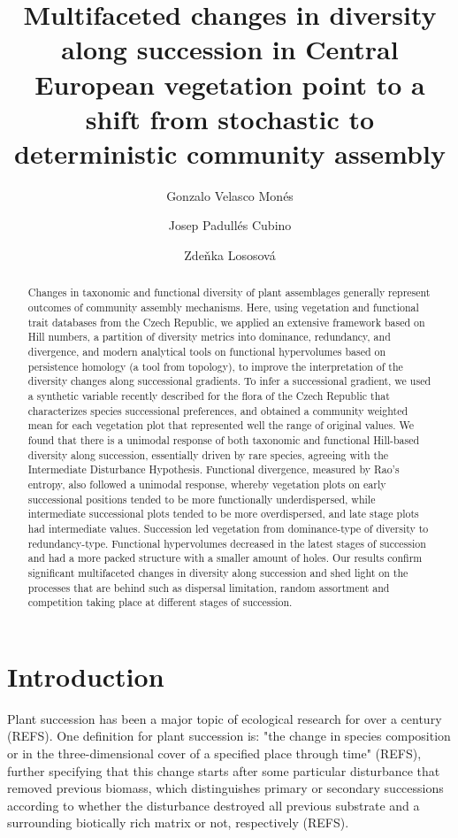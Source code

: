 \documentclass[a4paper, 9pt]{article}
\title{Multifaceted changes in diversity along succession in Central European vegetation point to a shift from stochastic to deterministic community assembly}
\author[1]{Gonzalo Velasco Monés}
\author[2,3]{Josep Padullés Cubino}
\author[1]{Zdeňka Lososová}
\affil[1]{
	Department of Botany \& Zoology, Faculy of Science, Masaryk University, Kotlářská 2, 611 37, Brno, Czech Republic}
\affil[2]{
	Autonomous University of Barcelona, 08193 Cerdanyola del Vallès, Spain}
\affil[3]{
	Centre de Recerca d’Ecologia i Aplicacions Forestals (CREAF), 08193 Cerdanyola del Vallès, Spain}
\newcommand{\refs}{(\alert{REFS})}
\begin{document}
	
	\maketitle
	
	\begin{abstract}
		Changes in taxonomic and functional diversity of plant assemblages generally represent outcomes of community assembly mechanisms. Here, using vegetation and functional trait databases from the Czech Republic, we applied an extensive framework based on Hill numbers, a partition of diversity metrics into dominance, redundancy, and divergence, and modern analytical tools on functional hypervolumes based on persistence homology (a tool from topology), to improve the interpretation of the diversity changes along successional gradients. To infer a successional gradient, we used a synthetic variable recently described for the flora of the Czech Republic that characterizes species successional preferences, and obtained a community weighted mean for each vegetation plot that represented well the range of original values. We found that there is a unimodal response of both taxonomic and functional Hill-based diversity along succession, essentially driven by rare species, agreeing with the Intermediate Disturbance Hypothesis. Functional divergence, measured by Rao’s entropy, also followed a unimodal response, whereby vegetation plots on early successional positions tended to be more functionally underdispersed, while intermediate successional plots tended to be more overdispersed, and late stage plots had intermediate values.  Succession led vegetation from dominance-type of diversity to redundancy-type. Functional hypervolumes decreased in the latest stages of succession and had a more packed structure with a smaller amount of holes. Our results confirm significant multifaceted changes in diversity along succession and shed light on the processes that are behind such as dispersal limitation, random assortment and competition taking place at different stages of succession.
	\end{abstract}
	
	
	\section*{Introduction}
	\label{sec:Intro}
	
	Plant succession has been a major topic of ecological research for over a century \refs. One definition for plant succession is: "the change in species composition or in the three-dimensional cover of a specified place through time" \refs, further specifying that this change starts after some particular disturbance that removed previous biomass, which distinguishes primary or secondary successions according to whether the disturbance destroyed all previous substrate and a surrounding biotically rich matrix or not, respectively \refs. 
	
\end{document}
